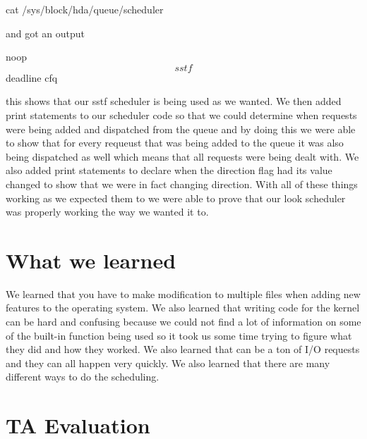\documentclass[letterpaper,10pt,titlepage]{article}
\begin{document}
cat /sys/block/hda/queue/scheduler

and got an output

noop \[sstf\] deadline cfq

this shows that our sstf scheduler is being used as we wanted. We then 
added print statements to our scheduler code so that we could determine 
when requests were being added and dispatched from the queue and by doing 
this we were able to show that for every requeust that was being added to 
the queue it was also being dispatched as well which means that all requests 
were being dealt with. We also added print statements to declare when the direction flag had its value changed to show that we were in fact changing direction. With all of these things 
working as we expected them to we were able to prove that our look 
scheduler was properly working the way we wanted it to. 

\section{What we learned}
We learned that you have to make modification to multiple files when adding 
new features to the operating system. We also learned that writing code for 
the kernel can be hard and confusing because we could not find a lot of 
information on some of the built-in function being used so it took us some 
time trying to figure what they did and how they worked. We also learned that 
can be a ton of I/O requests and they can all happen very quickly. We also 
learned that there are many different ways to do the scheduling. 

\section{TA Evaluation}
\end{document}
